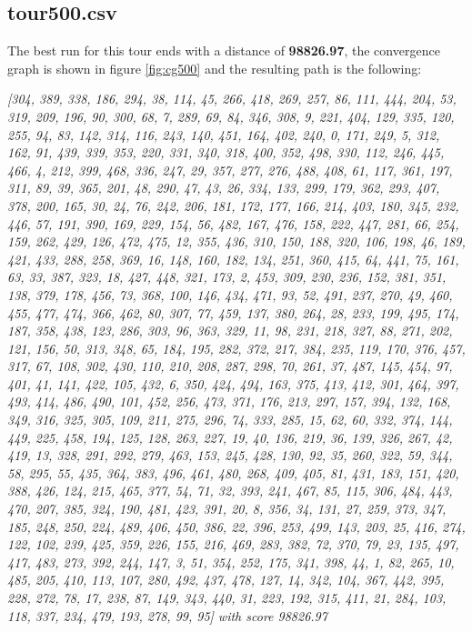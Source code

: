 \documentclass[a4paper,10pt]{article}
\begin{document}
\subsection{tour500.csv}
The best run for this tour ends with a distance of \textbf{98826.97}, the convergence graph is shown in figure \ref{fig:cg500} and the resulting path is the following:
\begin{center}
	\small
	\textit{[304, 389, 338, 186, 294, 38, 114, 45, 266, 418, 269, 257, 86, 111, 444, 204, 53, 319, 209, 196, 90, 300, 68, 7, 289, 69, 84, 346, 308, 9, 221, 404, 129, 335, 120, 255, 94, 83, 142, 314, 116, 243, 140, 451, 164, 402, 240, 0, 171, 249, 5, 312, 162, 91, 439, 339, 353, 220, 331, 340, 318, 400, 352, 498, 330, 112, 246, 445, 466, 4, 212, 399, 468, 336, 247, 29, 357, 277, 276, 488, 408, 61, 117, 361, 197, 311, 89, 39, 365, 201, 48, 290, 47, 43, 26, 334, 133, 299, 179, 362, 293, 407, 378, 200, 165, 30, 24, 76, 242, 206, 181, 172, 177, 166, 214, 403, 180, 345, 232, 446, 57, 191, 390, 169, 229, 154, 56, 482, 167, 476, 158, 222, 447, 281, 66, 254, 159, 262, 429, 126, 472, 475, 12, 355, 436, 310, 150, 188, 320, 106, 198, 46, 189, 421, 433, 288, 258, 369, 16, 148, 160, 182, 134, 251, 360, 415, 64, 441, 75, 161, 63, 33, 387, 323, 18, 427, 448, 321, 173, 2, 453, 309, 230, 236, 152, 381, 351, 138, 379, 178, 456, 73, 368, 100, 146, 434, 471, 93, 52, 491, 237, 270, 49, 460, 455, 477, 474, 366, 462, 80, 307, 77, 459, 137, 380, 264, 28, 233, 199, 495, 174, 187, 358, 438, 123, 286, 303, 96, 363, 329, 11, 98, 231, 218, 327, 88, 271, 202, 121, 156, 50, 313, 348, 65, 184, 195, 282, 372, 217, 384, 235, 119, 170, 376, 457, 317, 67, 108, 302, 430, 110, 210, 208, 287, 298, 70, 261, 37, 487, 145, 454, 97, 401, 41, 141, 422, 105, 432, 6, 350, 424, 494, 163, 375, 413, 412, 301, 464, 397, 493, 414, 486, 490, 101, 452, 256, 473, 371, 176, 213, 297, 157, 394, 132, 168, 349, 316, 325, 305, 109, 211, 275, 296, 74, 333, 285, 15, 62, 60, 332, 374, 144, 449, 225, 458, 194, 125, 128, 263, 227, 19, 40, 136, 219, 36, 139, 326, 267, 42, 419, 13, 328, 291, 292, 279, 463, 153, 245, 428, 130, 92, 35, 260, 322, 59, 344, 58, 295, 55, 435, 364, 383, 496, 461, 480, 268, 409, 405, 81, 431, 183, 151, 420, 388, 426, 124, 215, 465, 377, 54, 71, 32, 393, 241, 467, 85, 115, 306, 484, 443, 470, 207, 385, 324, 190, 481, 423, 391, 20, 8, 356, 34, 131, 27, 259, 373, 347, 185, 248, 250, 224, 489, 406, 450, 386, 22, 396, 253, 499, 143, 203, 25, 416, 274, 122, 102, 239, 425, 359, 226, 155, 216, 469, 283, 382, 72, 370, 79, 23, 135, 497, 417, 483, 273, 392, 244, 147, 3, 51, 354, 252, 175, 341, 398, 44, 1, 82, 265, 10, 485, 205, 410, 113, 107, 280, 492, 437, 478, 127, 14, 342, 104, 367, 442, 395, 228, 272, 78, 17, 238, 87, 149, 343, 440, 31, 223, 192, 315, 411, 21, 284, 103, 118, 337, 234, 479, 193, 278, 99, 95] with score 98826.97
}
\end{center}
\end{document}
